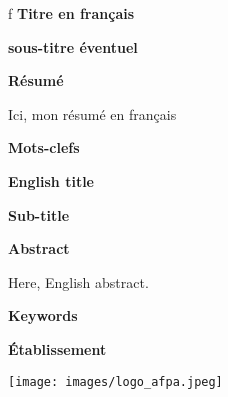 f\clearpage
\ifodd\thepage\hbox{}\newpage\else\fi%
\thispagestyle{empty}\parindent=0pt
{\Large \textbf{Titre en français}}

{\large \textbf{sous-titre éventuel}}

\hrulefill%
\begin{center}
{\Large \textbf{Résumé}}
\end{center}
Ici, mon résumé en français

\hrulefill%

{\Large \textbf{Mots-clefs}}

\hrulefill%

{\Large \textbf{English title}}

{\large \textbf{Sub-title}}

\hrulefill%
\begin{center}
{\Large \textbf{Abstract}}
\end{center}
Here, English abstract.

\hrulefill%

{\Large \textbf{Keywords}}

\hrulefill%


\hrulefill

{\Large \textbf{\'Etablissement} }

\hfill\texttt{[image: images/logo\_afpa.jpeg]} 

\hrulefill



